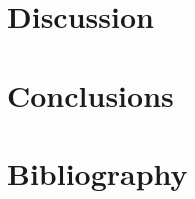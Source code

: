 \documentclass{scrartcl}
\begin{document}
    \section{Discussion}\label{sec:discussion}
    

    \section{Conclusions}\label{sec:conclusions}
    
    \clearpage

    

    

    \section{Bibliography}\label{sec:bibliography}
    ~\nocite{*}
    
    
\end{document}
